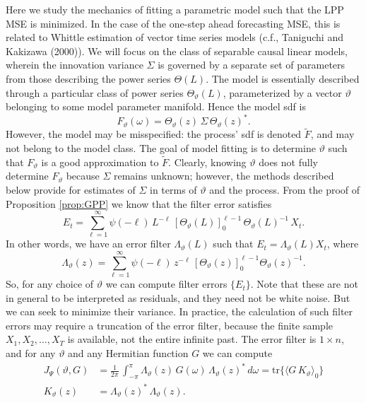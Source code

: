 \documentclass[a4paper]{book}
\begin{document}
 Here we study the mechanics of fitting a parametric model such that the LPP MSE
 is minimized.  In the case of the one-step ahead forecasting MSE, this is related
 to Whittle estimation of vector time series models (c.f.,  Taniguchi and Kakizawa (2000)).
  We will focus on the class of separable causal linear models, wherein the innovation variance
 $\Sigma$ is governed by a separate set of parameters from those describing the power
 series $\Theta (L)$.  The model is essentially described through a particular class of
 power series   $\Theta_{\vartheta} (L)$, parameterized by a vector $\vartheta $
  belonging to some model  parameter manifold.    Hence the model sdf is
\[
  F_{\vartheta} (\omega) = \Theta_{\vartheta} (z) \, \Sigma \,  { \Theta_{\vartheta} (z) }^*.
\]
 However, the model may be misspecified: the process' sdf is denoted $\widetilde{F}$, 
  and may not
 belong to the model class.  The goal of model fitting is to determine $\vartheta$ 
  such that
 $F_{\vartheta}$ is a good approximation to $\widetilde{F}$.  
 Clearly, knowing $\vartheta$ does not
 fully determine $F_{\vartheta}$ because $\Sigma$ remains unknown; however, the methods
 described below provide for estimates of $\Sigma$ in terms of $\vartheta$ and the process.
 From the proof of Proposition \ref{prop:GPP} we know that the filter error satisfies
\[
  E_t = \sum_{\ell =1 }^{\infty} \psi (-\ell) 
  \, L^{-\ell} \,  {[ \Theta_{\vartheta} (L) ]}_0^{\ell - 1} \, 
   { \Theta_{\vartheta} (L) }^{-1} \, X_t.
\] 
 In other words, we have an error filter $ \Lambda_{\vartheta} (L)  $ such that
  $E_t = \Lambda_{\vartheta} (L) X_t$,  where
\[
  \Lambda_{\vartheta} (z)  = \sum_{\ell =1 }^{\infty} \psi (-\ell) \,  z^{-\ell} \,
   {[ \Theta_{\vartheta} (z) ]}_0^{\ell - 1} { \Theta_{\vartheta} (z) }^{-1}. 
\]
  So,  for any choice of $\vartheta $ we can compute filter errors $\{ E_t \}$.
 Note that these are not in general to be interpreted as residuals, and they need not be white noise.
  But we can seek to minimize their variance.  In practice,
 the calculation of such filter errors  may require a truncation of the error filter, because the finite
 sample $X_1, X_2, \ldots, X_T$ is available, not the entire infinite past.  The error filter is
 $1 \times n$, and for any $\vartheta $ and any Hermitian function $G$ we can compute
\begin{align*}
  J_{\Psi} (\vartheta, G) & 	= \frac{1}{2 \pi} \, \int_{-\pi}^{\pi}
  \Lambda_{\vartheta} (z) \,    G(\omega)
  \,  { \Lambda_{\vartheta} (z) }^*   \, d\omega  = \mbox{tr} \{ 
 { \langle G \, K_{\vartheta} \rangle }_0 \} \\
   K_{\vartheta} (z) & =  { \Lambda_{\vartheta} (z)  }^* \, 
  \Lambda_{\vartheta} (z).
\end{align*}
\end{document}
